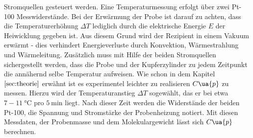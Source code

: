 Stromquellen gesteuert werden. Eine Temperaturmessung erfolgt über zwei
Pt-100 Messwiderstände. Bei der Erwärmung der Probe ist darauf zu achten, dass
die Temperaturerhöhung $\Delta T$ lediglich durch die elektrische Energie $E$
der Heiwicklung gegeben ist. Aus diesem Grund wird der Rezipient in einem
Vakuum erwärmt - dies verhindert Energieverluste durch Konvektion, Wärmestrahlung und
Wärmeleitung. Zusätzlich muss mit Hilfe der beiden Stromquellen sichergestellt
werden, dass die Probe und der Kupferzylinder zu jedem Zeitpunkt die annähernd
selbe Temperatur aufweisen. Wie schon in dem Kapitel $\ref{sec:theorie}$ erwähnt
ist es experimentel leichter zu realisieren $C\ua{p}$ zu messen.
Hierzu wird der Temperaturanstieg $\Delta T$ sogewählt, das er bei
etwa $7-\SI{11}{\degreeCelsius}$ pro $\SI{5}{\minute}$ liegt. Nach dieser Zeit werden die
Widerstände der beiden Pt-100, die Spannung und Stromstärke der Probenheizung notiert.
Mit diesen Messdaten, der Probenmasse und dem Molekulargewicht lässt sich $C\ua{p}$
berechnen.  
